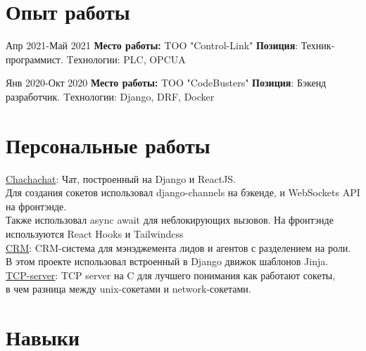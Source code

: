 \documentclass[10pt]{article} %
\begin{document}
\section{Опыт работы}

\job
{Апр 2021-}{Май 2021}
{\textbf{Место работы: }TOO "Control-Link" }
{\textbf{Позиция}: Техник-программист. Tехнологии: PLC, OPCUA}

\job
{Янв 2020-}{Окт 2020}
{\textbf{Место работы: }TOO "CodeBusters" }
{\textbf{Позиция}: Бэкенд разработчик. Tехнологии: Django, DRF, Docker}




\section{Персональные работы}


\href{https://github.com/kuator/chachachat}{Chachachat}: Чат, построенный на Django и ReactJS. \\
Для создания сокетов использовал django-channels на бэкенде, и WebSockets API на фронтэнде.\\
Также использовал async await для неблокирующих вызовов. На фронтэнде используются React Hooks и Tailwindcss\\

\href{https://github.com/kuator/customer-relations-management}{CRM}: CRM-система для мэнэджемента лидов и агентов с разделением на роли.\\
В этом проекте использовал встроенный в Django движок шаблонов Jinja. \\

\href{https://github.com/kuator/tcp-server}{TCP-server}: TCP server на C для лучшего понимания как работают сокеты,\\
в чем разница между unix-сокетами и network-сокетами.


\section{Навыки}
\end{document}
